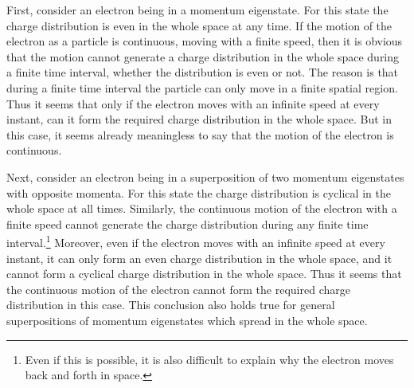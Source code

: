 First, consider an electron being in a momentum eigenstate. For this state the charge distribution is even in the whole space at any time.
If the motion of the electron as a particle is continuous, moving with a finite speed, then it is obvious that the motion cannot generate a charge distribution in the whole space during a finite time interval, whether the distribution is even or not. The reason is that during a finite time interval the particle can only move in a finite spatial region.
Thus it seems that only if the electron moves with an infinite speed at every instant, can it form the required charge distribution in the whole space. But in this case, it seems already meaningless to say that the motion of the electron is continuous. %

Next, consider an electron being in a superposition of two momentum eigenstates with opposite momenta. For this state the charge distribution is cyclical in the whole space at all times.
Similarly, the continuous motion of the electron with a finite speed cannot generate the charge distribution during any finite time interval.\footnote{Even if this is possible, it is also difficult to explain why the electron moves back and forth in space.} 
Moreover, even if the electron moves with an infinite speed at every instant, it can only form an even charge distribution in the whole space, and it cannot form a cyclical charge distribution in the whole space. Thus it seems that the continuous motion of the electron cannot form the required charge distribution in this case.
This conclusion also holds true for general superpositions of momentum eigenstates which spread in the whole space.

